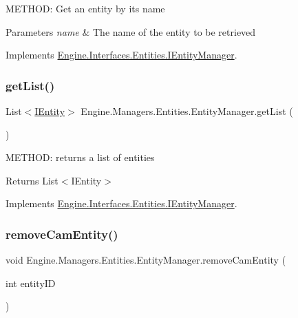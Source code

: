 M\+E\+T\+H\+OD\+: Get an entity by it\textquotesingle{}s name 


\begin{DoxyParams}{Parameters}
{\em name} & The name of the entity to be retrieved\\
\hline
\end{DoxyParams}


Implements \hyperlink{a00442_adff1edf326874f25e8a90bf45f020120}{Engine.\+Interfaces.\+Entities.\+I\+Entity\+Manager}.

\mbox{\label{a00518_a704e3c8fb916a8bb668ffd30654b4e18}} 
\subsubsection{\texorpdfstring{get\+List()}{getList()}}
{\footnotesize\ttfamily List$<$\hyperlink{a00438}{I\+Entity}$>$ Engine.\+Managers.\+Entities.\+Entity\+Manager.\+get\+List (\begin{DoxyParamCaption}{ }\end{DoxyParamCaption})\hspace{0.3cm}{\ttfamily [inline]}}



M\+E\+T\+H\+OD\+: returns a list of entities 

\begin{DoxyReturn}{Returns}
List$<$\+I\+Entity$>$
\end{DoxyReturn}


Implements \hyperlink{a00442_a8f71921098ae85f7f504f61a399a1bd8}{Engine.\+Interfaces.\+Entities.\+I\+Entity\+Manager}.

\mbox{\label{a00518_a5f4c775a02bbb9057577780643a7b068}} 
\subsubsection{\texorpdfstring{remove\+Cam\+Entity()}{removeCamEntity()}}
{\footnotesize\ttfamily void Engine.\+Managers.\+Entities.\+Entity\+Manager.\+remove\+Cam\+Entity (\begin{DoxyParamCaption}\item[{int}]{entity\+ID }\end{DoxyParamCaption})\hspace{0.3cm}{\ttfamily [inline]}}



